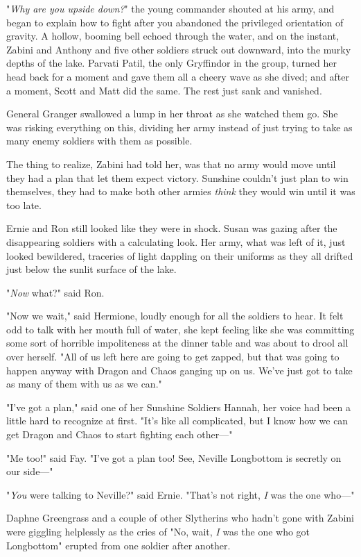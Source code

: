 "\emph{Why are you upside down?}" the young commander shouted at his army, and
began to explain how to fight after you abandoned the privileged orientation of
gravity.
\sbreak
A hollow, booming bell echoed through the water, and on the instant, Zabini and
Anthony and five other soldiers struck out downward, into the murky depths of
the lake. Parvati Patil, the only Gryffindor in the group, turned her head back
for a moment and gave them all a cheery wave as she dived; and after a moment,
Scott and Matt did the same. The rest just sank and vanished.

General Granger swallowed a lump in her throat as she watched them go. She was
risking everything on this, dividing her army instead of just trying to take as
many enemy soldiers with them as possible.

The thing to realize, Zabini had told her, was that no army would move until
they had a plan that let them expect victory. Sunshine couldn't just plan to
win themselves, they had to make both other armies \emph{think} they would win
until it was too late.

Ernie and Ron still looked like they were in shock. Susan was gazing after the
disappearing soldiers with a calculating look. Her army, what was left of it,
just looked bewildered, traceries of light dappling on their uniforms as they
all drifted just below the sunlit surface of the lake.

"\emph{Now} what?" said Ron.

"Now we wait," said Hermione, loudly enough for all the soldiers to hear. It
felt odd to talk with her mouth full of water, she kept feeling like she was
committing some sort of horrible impoliteness at the dinner table and was about
to drool all over herself. "All of us left here are going to get zapped, but
that was going to happen anyway with Dragon and Chaos ganging up on us. We've
just got to take as many of them with us as we can."

"I've got a plan," said one of her Sunshine Soldiers{\el} Hannah, her voice
had been a little hard to recognize at first. "It's like all complicated, but I
know how we can get Dragon and Chaos to start fighting each other\mbox{---}"

"Me too!" said Fay. "I've got a plan too! See, Neville Longbottom is secretly
on our side\mbox{---}"

"\emph{You} were talking to Neville?" said Ernie. "That's not right, \emph{I}
was the one who\mbox{---}"

Daphne Greengrass and a couple of other Slytherins who hadn't gone with Zabini
were giggling helplessly as the cries of "No, wait, \emph{I} was the one who
got Longbottom" erupted from one soldier after another.

